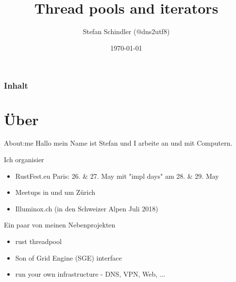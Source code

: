 \documentclass[aspectratio=1610,t]{beamer}
\title{Thread pools and iterators}
\date{\today}
\author{Stefan Schindler (@dns2utf8)}
\institute{Rust Zürichsee, Schweiz CH}
\begin{document}

\maketitle


\begin{frame}
	\frametitle{Inhalt}
	\setcounter{tocdepth}{1}
	\tableofcontents
\end{frame}



{
\section{Über}
}



\begin{frame}[fragile]{About:me}
Hallo mein Name ist Stefan und I arbeite an und mit Computern.

Ich organisier
\begin{itemize}
  \item RustFest.eu Paris: 26. \& 27. May mit "impl days" am 28. \& 29. May
  \item Meetups in und um Zürich
  \item Illuminox.ch (in den Schweizer Alpen Juli 2018)
\end{itemize}

Ein paar von meinen Nebenprojekten
\begin{itemize}
  \item rust threadpool
  \item Son of Grid Engine (SGE) interface
  \item run your own infrastructure - DNS, VPN, Web, ...
\end{itemize}
\end{frame}
\end{document}
